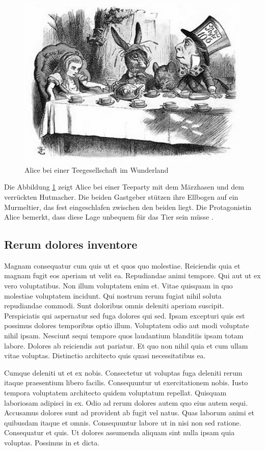 \documentclass[12pt, a4paper]{article}
\newcommand{\vglcite}[2]{\autocite[vgl.][S. #1]{#2}}
\newcommand{\verbcite}[2]{\autocite[][S. #1]{#2}}
\begin{document}
\begin{figure}
    \centering
    \includegraphics{alice}
    \caption{Alice bei einer Teegesellschaft im Wunderland \verbcite{33}{carroll1865}}
    \label{fig:teaparty}
\end{figure}

Die Abbildung \ref{fig:teaparty} zeigt Alice bei einer Teeparty mit dem Märzhasen und dem verrückten Hutmacher. Die beiden Gastgeber stützen ihre Ellbogen auf ein Murmeltier, das fest eingeschlafen zwischen den beiden liegt. Die Protagonistin Alice bemerkt, dass diese Lage unbequem für das Tier sein müsse \vglcite{33f}{carroll1865}.

\subsection{Rerum dolores inventore}

Magnam consequatur cum quis ut et quos quo molestiae. Reiciendis quia et magnam fugit eos aperiam ut velit ea. Repudiandae animi tempore. Qui aut ut ex vero voluptatibus. Non illum voluptatem enim et. Vitae quisquam in quo molestiae voluptatem incidunt. Qui nostrum rerum fugiat nihil soluta repudiandae commodi. Sunt doloribus omnis deleniti aperiam suscipit. Perspiciatis qui aspernatur sed fuga dolores qui sed. Ipsam excepturi quis est possimus dolores temporibus optio illum. Voluptatem odio aut modi voluptate nihil ipsam. Nesciunt sequi tempore quos laudantium blanditiis ipsam totam labore. Dolores ab reiciendis aut pariatur. Et quo non nihil quia et cum ullam vitae voluptas. Distinctio architecto quis quasi necessitatibus ea.

Cumque deleniti ut et ex nobis. Consectetur ut voluptas fuga deleniti rerum itaque praesentium libero facilis. Consequuntur ut exercitationem nobis. Iusto tempora voluptatem architecto quidem voluptatum repellat. Quisquam laboriosam adipisci in ex. Odio ad rerum dolores autem quo eius autem sequi. Accusamus dolores sunt ad provident ab fugit vel natus. Quas laborum animi et quibusdam itaque et omnis. Consequuntur labore ut in nisi non sed ratione. Consequatur et quis. Ut dolores assumenda aliquam sint nulla ipsam quia voluptas. Possimus in et dicta.
\end{document}

